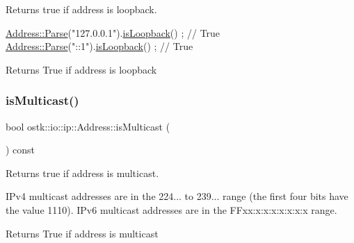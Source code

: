 Returns true if address is loopback. 


\begin{DoxyCode}
\hyperlink{classostk_1_1io_1_1ip_1_1_address_a3d60e44d816e30f17db36f9bb7ac6307}{Address::Parse}(\textcolor{stringliteral}{"127.0.0.1"}).\hyperlink{classostk_1_1io_1_1ip_1_1_address_aed5c82ceb025f23bcf17b5a76f1c4758}{isLoopback}() ; \textcolor{comment}{// True}
\hyperlink{classostk_1_1io_1_1ip_1_1_address_a3d60e44d816e30f17db36f9bb7ac6307}{Address::Parse}(\textcolor{stringliteral}{"::1"}).\hyperlink{classostk_1_1io_1_1ip_1_1_address_aed5c82ceb025f23bcf17b5a76f1c4758}{isLoopback}() ; \textcolor{comment}{// True}
\end{DoxyCode}


\begin{DoxyReturn}{Returns}
True if address is loopback 
\end{DoxyReturn}
\mbox{\label{classostk_1_1io_1_1ip_1_1_address_aee49b8e42c67256b4627f29126bb1209}} 
\subsubsection{\texorpdfstring{is\+Multicast()}{isMulticast()}}
{\footnotesize\ttfamily bool ostk\+::io\+::ip\+::\+Address\+::is\+Multicast (\begin{DoxyParamCaption}{ }\end{DoxyParamCaption}) const}



Returns true if address is multicast. 

I\+Pv4 multicast addresses are in the 224... to 239... range (the first four bits have the value 1110). I\+Pv6 multicast addresses are in the F\+Fxx\+:x\+:x\+:x\+:x\+:x\+:x\+:x range.

\begin{DoxyReturn}{Returns}
True if address is multicast 
\end{DoxyReturn}
\mbox{\label{classostk_1_1io_1_1ip_1_1_address_abc097099261de731a2478073b2cc14d9}} 
